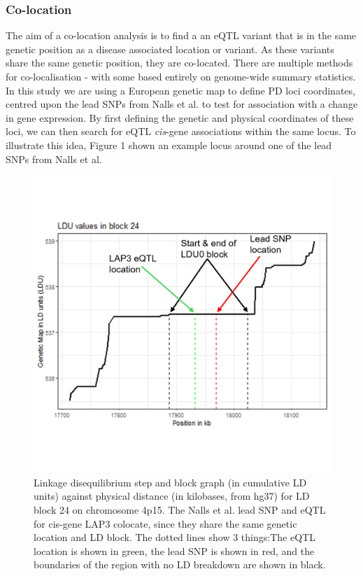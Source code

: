 \documentclass{article}
\begin{document}
\subsubsection{Co-location}
\label{subsubsec:co-location}
The aim of a co-location analysis is to find a an eQTL variant that is in the same genetic position as a disease associated location or variant\cite{Cano-Gamez2020FromDiseases}. As these variants share the same genetic position, they are co-located. There are multiple methods for co-localisation - with some based entirely on genome-wide summary statistics. In this study we are using a European genetic map\cite{Maniatis2004PositionalDisequilibrium.} to define PD loci coordinates, centred upon the lead SNPs from Nalls et al.\cite{Nalls2019IdentificationStudies} to test for association with a change in gene expression. By first defining the genetic and physical coordinates of these loci, we can then search for eQTL \textit{cis}-gene associations within the same locus. To illustrate this idea, Figure 1 shown an example locus around one of the lead SNPs from Nalls et al.\cite{Nalls2019IdentificationStudies}
\begin{figure}[!h]
    \centering
    \includegraphics[width=1\linewidth]{Thesis/thesis images/exampleblock.png}
    \caption{Linkage disequilibrium step and block graph (in cumulative LD units) against physical distance (in kilobases, from hg37) for LD block 24 on chromosome 4p15. The Nalls et al. lead SNP and eQTL for cis-gene LAP3 colocate, since they share the same genetic location and LD block. The dotted lines show 3 things:The eQTL location is shown in green, the lead SNP is shown in red, and the boundaries of the region with no LD breakdown are shown in black.}
    \label{fig:block}
\end{figure}
\end{document}

